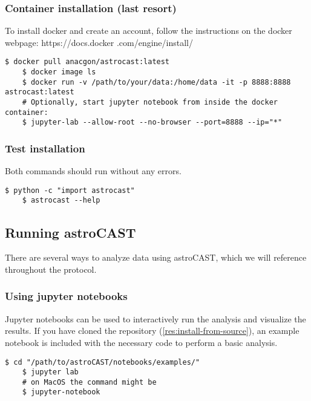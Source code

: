 \subsubsection{Container installation (last resort)}

To install docker and create an account, follow the instructions on the docker webpage: https://docs.docker
.com/engine/install/

\begin{lstlisting}[style=bashStyle]
    $ docker pull anacgon/astrocast:latest
    $ docker image ls
    $ docker run -v /path/to/your/data:/home/data -it -p 8888:8888 astrocast:latest
    # Optionally, start jupyter notebook from inside the docker container:
    $ jupyter-lab --allow-root --no-browser --port=8888 --ip="*"
\end{lstlisting}

\subsubsection{Test installation}

Both commands should run without any errors.

\begin{lstlisting}[style=bashStyle]
    $ python -c "import astrocast"
    $ astrocast --help
\end{lstlisting}

\subsection{Running astroCAST}

There are several ways to analyze data using \ac{astroCAST}, which we will reference throughout the protocol.

\subsubsection{Using jupyter notebooks}

Jupyter notebooks can be used to interactively run the analysis and visualize the results.
If you have cloned the repository (\ref{res:install-from-source}), an example notebook is included with the necessary
code to perform a basic analysis.

\begin{lstlisting}[style=bashStyle]
    $ cd "/path/to/astroCAST/notebooks/examples/"
    $ jupyter lab
    # on MacOS the command might be
    $ jupyter-notebook
\end{lstlisting}

